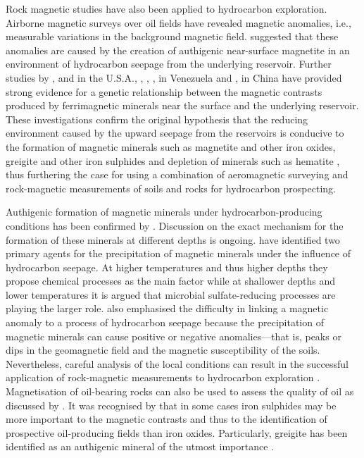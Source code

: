 Rock magnetic studies have also been applied to hydrocarbon exploration. Airborne magnetic surveys over oil fields \citep{Donovan1979} have revealed magnetic anomalies, i.e., measurable variations in the background magnetic field. \citet{Donovan1979} suggested that these anomalies are caused by the creation of authigenic near-surface magnetite in an environment of hydrocarbon seepage from the underlying reservoir. Further studies by \citet{Donovan1984}, \citet{Elmore1993} and \citet{Reynolds1993} in the U.S.A., \citet{Diaz2000}, \citet{Costanzo2006,Costanzo2012}, \citet{Gonzalez2002}, \citet{Guzman2011} in Venezuela and \citet{Liu1999}, \citet{Liu2004,Liu2006} in China have provided strong evidence for a genetic relationship between the magnetic contrasts produced by ferrimagnetic minerals near the surface and the underlying reservoir. These investigations confirm the original hypothesis \citep{Donovan1979} that the reducing environment caused by the upward seepage from the reservoirs is conducive to the formation of magnetic minerals such as magnetite and other iron oxides, greigite and other iron sulphides and depletion of minerals such as hematite \citep{Machel1991}, thus furthering the case for using a combination of aeromagnetic surveying and rock-magnetic measurements of soils and rocks for hydrocarbon prospecting.\par

Authigenic formation of magnetic minerals under hydrocarbon-producing conditions has been confirmed by \citet{Abubakar2015}. Discussion on the exact mechanism for the formation of these minerals at different depths is ongoing. \citet{Machel1991} have identified two primary agents for the precipitation of magnetic minerals under the influence of hydrocarbon seepage. At higher temperatures and thus higher depths they propose chemical processes as the main factor while at shallower depths and lower temperatures it is argued that microbial sulfate-reducing processes are playing the larger role. \citet{Machel1991} also emphasised the difficulty in linking a magnetic anomaly to a process of hydrocarbon seepage because the precipitation of magnetic minerals can cause positive or negative anomalies---that is, peaks or dips in the geomagnetic field and the magnetic susceptibility of the soils. Nevertheless, careful analysis of the local conditions can result in the successful application of rock-magnetic measurements to hydrocarbon exploration \citep{Donovan1984,Liu2006,Emmerton2013B}. Magnetisation of oil-bearing rocks can also be used to assess the quality of oil as discussed by \citet{Emmerton2013}. It was recognised by \citet{Reynolds1993} that in some cases iron sulphides may be more important to the magnetic contrasts and thus to the identification of prospective oil-producing fields than iron oxides. Particularly, greigite has been identified as an authigenic mineral of the utmost importance \citep{Reynolds1993}.\par

